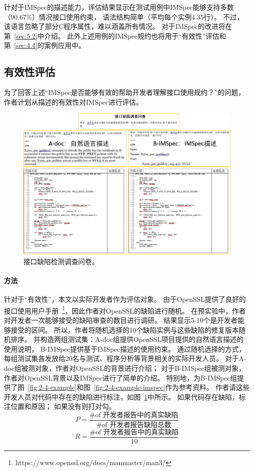 针对于IMSpec的描述能力，评估结果显示在测试用例中IMSpec能够支持多数（90.67\%）情况接口使用约束，
语法结构简单（平均每个实例4.35行）。
不过，该语言忽略了部分C程序属性，难以涵盖所有情况。
对于IMSpec的改进将在第~\ref{sec:5.2}中介绍。
此外上述用例的IMSpec规约也将用于“有效性”评估和第~\ref{sec:4.4}的案例应用中。


\subsection{有效性评估}
为了回答上述“IMSpec是否能够有效的帮助开发者理解接口使用规约？”的问题，
作者计划从描述的有效性对IMSpec进行评估。

\begin{figure}[b]
	\centering
	\includegraphics[width=0.85\linewidth]{figures/cp2-survey.png}
	\caption{
		接口缺陷检测调查问卷。
	}
	\label{fig:2-5-survey}
\end{figure}

\paragraph{方法}
针对于“有效性”，本文以实际开发者作为评估对象。
由于OpenSSL提供了良好的接口使用用户手册~\footnote{https://www.openssl.org/docs/manmaster/man3/}，因此作者对OpenSSL的缺陷进行随机。
在预实验中，作者对开发者一次能够接受的缺陷审查的数目进行调研。
结果显示5-10个是开发者能够接受的区间。
所以，作者将随机选择的10个缺陷实例与这些缺陷的修复版本随机排序。
并构造两组测试集：A-doc组提供OpenSSL项目提供的自然语言描述的使用说明，
B-IMSpec提供基于IMSpec描述的使用约束。
通过随机选择的方式，每组测试集各发放给20名与测试、程序分析等背景相关的实际开发人员。
对于A-doc组被测对象，作者对OpenSSL的背景进行介绍；
对于B-IMSpec组被测对象，作者对OpenSSL背景以及IMSpec进行了简单的介绍。
特别地，为B-IMSpec组提供了图~\ref{fig:2-4-example}和图~\ref{fig:2-4-example-imspec}作为参考资料。
作者请这些开发人员对代码中存在的缺陷进行标注，如图~\ref{fig:2-5-survey}中所示。
如果代码存在缺陷，标注位置和原因；
如果没有则打对勾。
\begin{equation}
\label{eq:p}
P = \dfrac{\text{\# of 开发者报告中的真实缺陷}}{\text{\# of 开发者报告缺陷总数}}
\end{equation}
\begin{equation}
\label{eq:r}
R = \dfrac{\text{\# of 开发者报告中的真实缺陷}}{10}
\end{equation}


